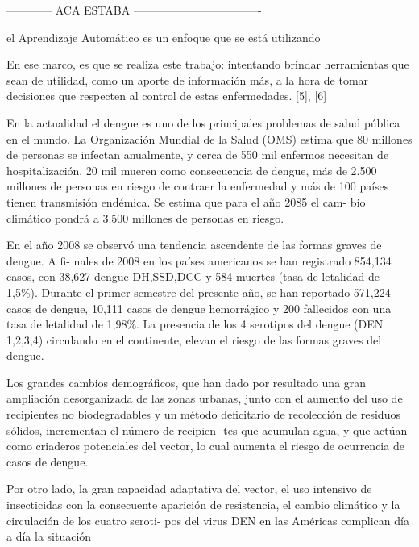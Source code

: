   ------------ ACA ESTABA ----------------------------------


el Aprendizaje
Automático es un enfoque que se está utilizando

En ese marco, es que se realiza este trabajo: intentando brindar herramientas
que sean de utilidad, como un aporte de información más, a la hora de tomar
decisiones que respecten al control de estas enfermedades. [5], [6]





En la actualidad el dengue es uno de los principales problemas de salud pública en el mundo.
La  Organización  Mundial  de  la  Salud  (OMS)  estima  que  80  millones  de  personas  se  infectan
anualmente,  y  cerca  de  550  mil  enfermos  necesitan  de  hospitalización,  20  mil  mueren  como
consecuencia de dengue, más de 2.500 millones de personas en riesgo de contraer la enfermedad
y más de 100 países tienen transmisión endémica. Se estima que para el año 2085 el cam-
bio climático pondrá a 3.500 millones de personas en riesgo.


En  el  año  2008  se  observó  una  tendencia  ascendente  de  las  formas  graves  de  dengue.  A  fi-
nales  de  2008  en  los  países  americanos  se  han  registrado  854,134  casos,  con  38,627  dengue
DH,SSD,DCC y 584 muertes (tasa de letalidad de 1,5\%). Durante el  primer semestre del presente
año, se han reportado 571,224 casos de dengue, 10,111 casos de dengue hemorrágico y 200
fallecidos con una tasa de letalidad de 1,98\%. La presencia de los 4 serotipos del dengue (DEN
1,2,3,4) circulando en el continente, elevan el riesgo de las formas graves del dengue.


Los grandes cambios demográficos, que han dado por resultado una gran ampliación desorganizada
de las zonas urbanas, junto con el aumento del uso de recipientes no biodegradables
y un método deficitario de recolección de residuos sólidos, incrementan el número de recipien-
tes que acumulan agua, y que actúan como criaderos potenciales del vector, lo cual aumenta el
riesgo de ocurrencia de casos de dengue.


Por  otro  lado,  la  gran  capacidad  adaptativa  del  vector,  el  uso  intensivo  de  insecticidas  con  la
consecuente aparición de resistencia, el cambio climático y la circulación de los cuatro seroti-
pos del virus DEN en las Américas complican día a día la situación



